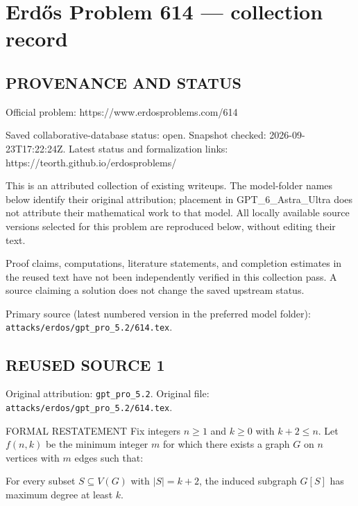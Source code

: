 \section*{Erd\H{o}s Problem 614 --- collection record}

\subsection*{PROVENANCE AND STATUS}
Official problem: https://www.erdosproblems.com/614

Saved collaborative-database status: open.
Snapshot checked: 2026-09-23T17:22:24Z.
Latest status and formalization links: https://teorth.github.io/erdosproblems/

This is an attributed collection of existing writeups. The model-folder names below identify their original attribution; placement in GPT\_6\_Astra\_Ultra does not attribute their mathematical work to that model. All locally available source versions selected for this problem are reproduced below, without editing their text.

Proof claims, computations, literature statements, and completion estimates in the reused text have not been independently verified in this collection pass. A source claiming a solution does not change the saved upstream status.

Primary source (latest numbered version in the preferred model folder): \texttt{attacks/erdos/gpt\_pro\_5.2/614.tex}.

\subsection*{REUSED SOURCE 1}
Original attribution: \texttt{gpt\_pro\_5.2}.
Original file: \texttt{attacks/erdos/gpt\_pro\_5.2/614.tex}.


FORMAL RESTATEMENT
Fix integers $n\ge 1$ and $k\ge 0$ with $k+2\le n$.
Let $f(n,k)$ be the minimum integer $m$ for which there exists a graph $G$ on $n$
vertices with $m$ edges such that:

\medskip
\noindent For every subset $S\subseteq V(G)$ with $|S|=k+2$, the induced subgraph
$G[S]$ has maximum degree at least $k$.


